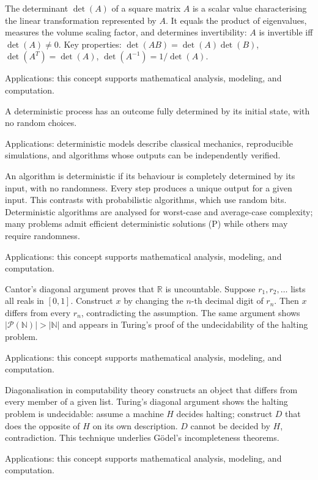 The determinant $\det(A)$ of a square matrix $A$ is a scalar value characterising the linear transformation represented by $A$. It equals the product of eigenvalues, measures the volume scaling factor, and determines invertibility: $A$ is invertible iff $\det(A) \neq 0$. Key properties: $\det(AB) = \det(A)\det(B)$, $\det(A^T) = \det(A)$, $\det(A^{-1}) = 1/\det(A)$. \par\noindent Applications: this concept supports mathematical analysis, modeling, and computation.

A deterministic process has an outcome fully determined by its initial state, with no random choices. \par\noindent Applications: deterministic models describe classical mechanics, reproducible simulations, and algorithms whose outputs can be independently verified.

An algorithm is deterministic if its behaviour is completely determined by its input, with no randomness. Every step produces a unique output for a given input. This contrasts with probabilistic algorithms, which use random bits. Deterministic algorithms are analysed for worst-case and average-case complexity; many problems admit efficient deterministic solutions (P) while others may require randomness. \par\noindent Applications: this concept supports mathematical analysis, modeling, and computation.

Cantor's diagonal argument proves that $\mathbb{R}$ is uncountable. Suppose $r_1, r_2, \ldots$ lists all reals in $[0,1]$. Construct $x$ by changing the $n$-th decimal digit of $r_n$. Then $x$ differs from every $r_n$, contradicting the assumption. The same argument shows $|\mathcal{P}(\mathbb{N})| > |\mathbb{N}|$ and appears in Turing's proof of the undecidability of the halting problem. \par\noindent Applications: this concept supports mathematical analysis, modeling, and computation.

Diagonalisation in computability theory constructs an object that differs from every member of a given list. Turing's diagonal argument shows the halting problem is undecidable: assume a machine $H$ decides halting; construct $D$ that does the opposite of $H$ on its own description. $D$ cannot be decided by $H$, contradiction. This technique underlies Gödel's incompleteness theorems. \par\noindent Applications: this concept supports mathematical analysis, modeling, and computation.

